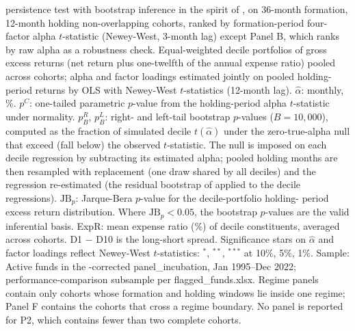 \begin{table}[!htbp]
\begin{minipage}{\tabletempwidth}
\begin{singlespace}
\textcite{Carhart1997} persistence test with bootstrap inference in the spirit of \textcite{KosowskiTimmermannWermersWhite2006}, on 36-month formation, 12-month holding non-overlapping cohorts, ranked by formation-period \textcite{Carhart1997} four-factor alpha $t$-statistic (Newey-West, 3-month lag) except Panel B, which ranks by raw alpha as a robustness check. Equal-weighted decile portfolios of gross excess returns (net return plus one-twelfth of the annual expense ratio) pooled across cohorts; alpha and factor loadings estimated jointly on pooled holding-period returns by OLS with Newey-West $t$-statistics (12-month lag). $\hat{\alpha}$: monthly, \%. $p^C$: one-tailed parametric $p$-value from the holding-period alpha $t$-statistic under normality. $p^R_B$, $p^L_B$: right- and left-tail bootstrap $p$-values ($B = 10{,}000$), computed as the fraction of simulated decile $t(\hat{\alpha})$ under the zero-true-alpha null that exceed (fall below) the observed $t$-statistic. The null is imposed on each decile regression by subtracting its estimated alpha; pooled holding months are then resampled with replacement (one draw shared by all deciles) and the regression re-estimated (the residual bootstrap of \textcite{FamaFrench2010} applied to the decile regressions). $\text{JB}_p$: Jarque-Bera $p$-value for the decile-portfolio holding- period excess return distribution. Where $\text{JB}_p < 0.05$, the bootstrap $p$-values are the valid inferential basis. ExpR: mean expense ratio (\%) of decile constituents, averaged across cohorts. D1 $-$ D10 is the long-short spread. Significance stars on $\hat{\alpha}$ and factor loadings reflect Newey-West $t$-statistics: $^{*}$, $^{**}$, $^{***}$ at 10\%, 5\%, 1\%. Sample: Active funds in the \textcite{Evans2010}-corrected panel\_incubation, Jan 1995--Dec 2022; performance-comparison subsample per flagged\_funds.xlsx. Regime panels contain only cohorts whose formation and holding windows lie inside one regime; Panel F contains the cohorts that cross a regime boundary. No panel is reported for P2, which contains fewer than two complete cohorts.
\end{singlespace}
\end{minipage}
\end{table}

